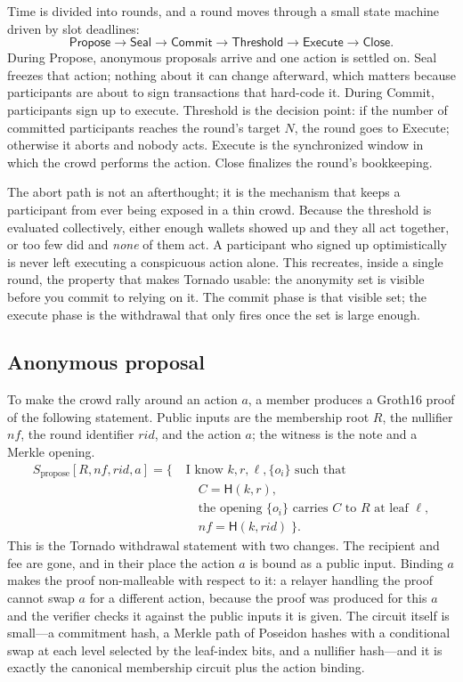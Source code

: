 \documentclass[11pt]{article}
\newcommand{\hash}{\mathsf{H}}
\begin{document}
Time is divided into rounds, and a round moves through a small state machine
driven by slot deadlines:
\[
  \textsf{Propose} \to \textsf{Seal} \to \textsf{Commit}
  \to \textsf{Threshold} \to \textsf{Execute} \to \textsf{Close}.
\]
During \textsf{Propose}, anonymous proposals arrive and one action is settled on.
\textsf{Seal} freezes that action; nothing about it can change afterward, which
matters because participants are about to sign transactions that hard-code it.
During \textsf{Commit}, participants sign up to execute. \textsf{Threshold} is the
decision point: if the number of committed participants reaches the round's
target $N$, the round goes to \textsf{Execute}; otherwise it aborts and nobody
acts. \textsf{Execute} is the synchronized window in which the crowd performs the
action. \textsf{Close} finalizes the round's bookkeeping.

The abort path is not an afterthought; it is the mechanism that keeps a
participant from ever being exposed in a thin crowd. Because the threshold is
evaluated collectively, either enough wallets showed up and they all act
together, or too few did and \emph{none} of them act. A participant who signed up
optimistically is never left executing a conspicuous action alone. This recreates,
inside a single round, the property that makes Tornado usable: the anonymity set
is visible before you commit to relying on it. The commit phase is that visible
set; the execute phase is the withdrawal that only fires once the set is large
enough.

\subsection{Anonymous proposal}
\label{sec:propose}

To make the crowd rally around an action $a$, a member produces a Groth16 proof
of the following statement. Public inputs are the membership root $R$, the
nullifier $\mathit{nf}$, the round identifier $\mathit{rid}$, and the action $a$;
the witness is the note and a Merkle opening.
\[
\begin{aligned}
S_{\mathrm{propose}}[R, \mathit{nf}, \mathit{rid}, a] = \bigl\{\;
& \text{I know } k, r, \ell, \{o_i\} \text{ such that} \\
& \quad C = \hash(k, r), \\
& \quad \text{the opening } \{o_i\} \text{ carries } C \text{ to } R \text{ at leaf } \ell, \\
& \quad \mathit{nf} = \hash(k, \mathit{rid}) \;\bigr\}.
\end{aligned}
\]
This is the Tornado withdrawal statement with two changes. The recipient and fee
are gone, and in their place the action $a$ is bound as a public input. Binding
$a$ makes the proof non-malleable with respect to it: a relayer handling the
proof cannot swap $a$ for a different action, because the proof was produced for
this $a$ and the verifier checks it against the public inputs it is given. The
circuit itself is small---a commitment hash, a Merkle path of Poseidon hashes with
a conditional swap at each level selected by the leaf-index bits, and a nullifier
hash---and it is exactly the canonical membership circuit plus the action binding.
\end{document}
